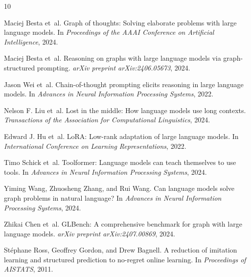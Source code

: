 \documentclass[sigplan,screen]{acmart}
\begin{document}
\begin{thebibliography}{10}

Maciej Besta et~al.
\newblock Graph of thoughts: Solving elaborate problems with large language models.
\newblock In \emph{Proceedings of the AAAI Conference on Artificial Intelligence}, 2024.

Maciej Besta et~al.
\newblock Reasoning on graphs with large language models via graph-structured prompting.
\newblock \emph{arXiv preprint arXiv:2406.05673}, 2024.

Jason Wei et~al.
\newblock Chain-of-thought prompting elicits reasoning in large language models.
\newblock In \emph{Advances in Neural Information Processing Systems}, 2022.

Nelson F. Liu et~al.
\newblock Lost in the middle: How language models use long contexts.
\newblock \emph{Transactions of the Association for Computational Linguistics}, 2024.

Edward J. Hu et~al.
\newblock LoRA: Low-rank adaptation of large language models.
\newblock In \emph{International Conference on Learning Representations}, 2022.

Timo Schick et~al.
\newblock Toolformer: Language models can teach themselves to use tools.
\newblock In \emph{Advances in Neural Information Processing Systems}, 2024.

Yiming Wang, Zhuosheng Zhang, and Rui Wang.
\newblock Can language models solve graph problems in natural language?
\newblock In \emph{Advances in Neural Information Processing Systems}, 2024.

Zhikai Chen et~al.
\newblock GLBench: A comprehensive benchmark for graph with large language models.
\newblock \emph{arXiv preprint arXiv:2407.00869}, 2024.

St\'ephane Ross, Geoffrey Gordon, and Drew Bagnell.
\newblock A reduction of imitation learning and structured prediction to no-regret online learning.
\newblock In \emph{Proceedings of AISTATS}, 2011.

\end{thebibliography}
\end{document}
